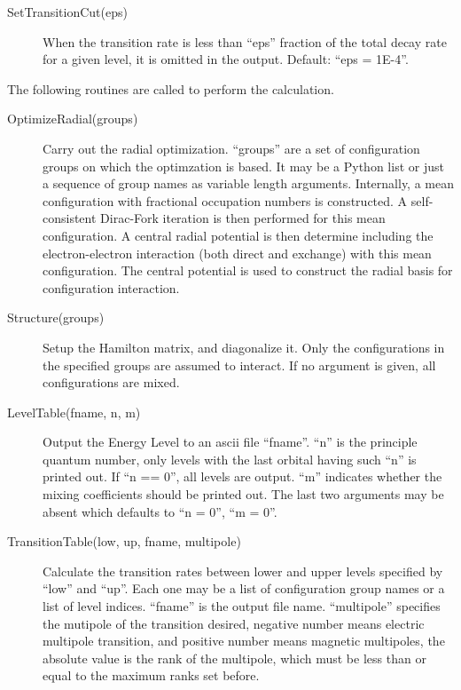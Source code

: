 \documentclass[12pt]{article}
\begin{document}
\begin{description}
\item[SetTransitionCut(eps)] 
When the transition rate is less than ``eps'' fraction of the total decay rate
for a given level, it is omitted in the output. Default: ``eps = 1E-4''. 

\end{description}

The following routines are called to perform the calculation.
\begin{description}
\item[OptimizeRadial(groups)] 
Carry out the radial optimization. ``groups'' are a set of configuration
groups on which the optimzation is based. It may be a Python list or just a
sequence of group names as variable length arguments. Internally, a mean
configuration with fractional 
occupation numbers is constructed. A self-consistent Dirac-Fork iteration
is then performed for this mean configuration. A central radial potential is
then determine including the electron-electron interaction (both direct and
exchange) with this mean configuration. The central potential is used to
construct the radial basis for configuration interaction. 

\item[Structure(groups)] 
Setup the Hamilton matrix, and diagonalize
it. Only the configurations in the specified groups are assumed to
interact. If no argument is given, all configurations are mixed. 

\item[LevelTable(fname, n, m)] 
Output the Energy Level to an ascii file ``fname''. ``n'' is the principle
quantum number, only levels with the last orbital having such ``n'' is printed
out. If ``n == 0'', all levels are output. ``m'' indicates whether the mixing
coefficients should be printed out. The last two arguments may be absent which
defaults to ``n = 0'', ``m = 0''.

\item[TransitionTable(low, up, fname, multipole)] 
Calculate the transition rates between lower and upper levels specified by
``low'' and ``up''. Each one may be a list of configuration group names or a
list of level indices. ``fname'' is the output file name. ``multipole''
specifies the mutipole of the transition desired, negative number means
electric multipole transition, and positive number means magnetic multipoles,
the absolute value is the rank of the multipole, which must be less than or
equal to the maximum ranks set before. 
\end{description}
\end{document}
